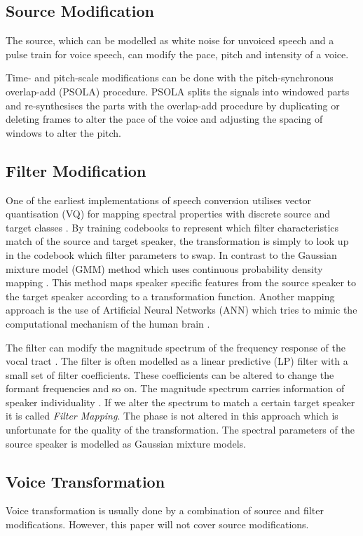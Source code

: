 \subsection{Source Modification} %
\label{sub:source_modification}
The source, which can be modelled as white noise for unvoiced speech and a pulse train for voice speech, can modify the pace, pitch and intensity of a voice. 

Time- and pitch-scale modifications can be done with the pitch-synchronous overlap-add (PSOLA) procedure. PSOLA splits the signals into windowed parts and re-synthesises the parts with the overlap-add procedure by duplicating or deleting frames to alter the pace of the voice and adjusting the spacing of windows to alter the pitch.

\subsection{Filter Modification} %
\label{sub:filter_modification}
One of the earliest implementations of speech conversion utilises vector quantisation (VQ) for mapping spectral properties with discrete source and target classes \cite{abe88}. By training codebooks to represent which filter characteristics match of the source and target speaker, the transformation is simply to look up in the codebook which filter parameters to swap. In contrast to the Gaussian mixture model (GMM) method which uses continuous probability density mapping \cite{stylianou98}. This method maps speaker specific features from the source speaker to the target speaker according to a transformation function. Another mapping approach is the use of Artificial Neural Networks (ANN) \cite{desai09} which tries to mimic the computational mechanism of the human brain \cite{young75}.

The filter can modify the magnitude spectrum of the frequency response of the vocal tract \cite{nguyen09}. The filter is often modelled as a linear predictive (LP) filter with a small set of filter coefficients. These coefficients can be altered to change the formant frequencies and so on. The magnitude spectrum carries information of speaker individuality \cite{stylianou09}. If we alter the spectrum to match a certain target speaker it is called \emph{Filter Mapping}. The phase is not altered in this approach which is unfortunate for the quality of the transformation. The spectral parameters of the source speaker is modelled as Gaussian mixture models.

\subsection{Voice Transformation} %
\label{sub:voice_transformation}
Voice transformation is usually done by a combination of source and filter modifications. However, this paper will not cover source modifications.

